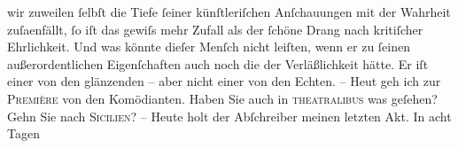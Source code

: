 \begin{ledgroupsized}[t]{13cm}
               wir zuweilen ſelbſt die Tiefe ſeiner künſtleriſchen Anſchauungen mit der Wahrheit
                  zuſa{\geminationm}enfällt, ſo iſt das gewiſs mehr Zufall als der
               ſchöne Drang nach kritiſcher Ehrlichkeit. Und was könnte dieſer Menſch nicht {\pb}leiſten, wenn er zu ſeinen außerordentlichen
               Eigenſchaften auch noch die der Verläßlichkeit hätte. Er iſt einer von den glänzenden
               – aber nicht einer von den Echten. –\pend
           \pstart
           Heut geh ich zur \textsc{Première} von den Komödianten. Haben Sie auch in \textsc{theatralibus} was {\pb}geſehen? Gehn Sie nach \textsc{Sicilien}? –\pend
           \pstart
           Heute holt der Abſchreiber
               meinen letzten Akt. In acht Tagen

\end{ledgroupsized}
